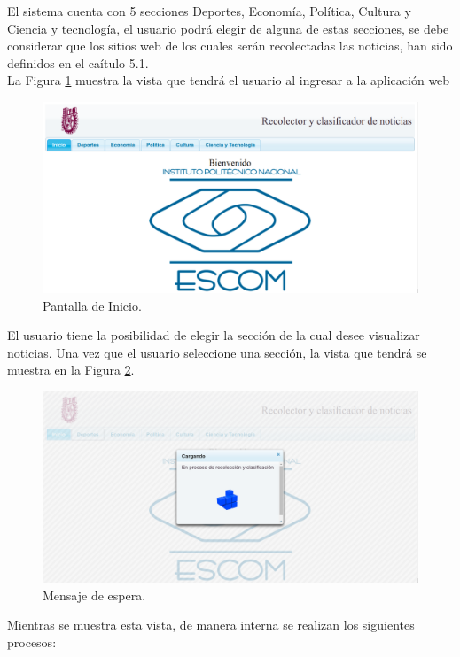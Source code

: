 El sistema cuenta con 5 secciones Deportes, Economía, Política, Cultura y Ciencia y tecnología, el usuario podrá elegir de alguna de estas secciones, se debe considerar que los sitios web de los cuales serán recolectadas las noticias, han sido definidos en el caítulo 5.1.\\
La Figura \ref{fig:PantallaInicio} muestra la vista que tendrá el usuario al ingresar a la aplicación web
\\
\begin{figure}[H]
\centering
\includegraphics[scale=0.29]{imagenes/Capitulo5/pantallaPrincipal.png}
\caption{Pantalla de Inicio.}
\label{fig:PantallaInicio}
\end{figure}

El usuario tiene la posibilidad de elegir la sección de la cual desee visualizar noticias. Una vez que el usuario seleccione una sección, la vista que tendrá se muestra en la Figura \ref{fig:loading}.
\\
\begin{figure}[H]
\centering
\includegraphics[scale=0.29]{imagenes/Capitulo5/mensajeEspera.png}
\caption{Mensaje de espera.}
\label{fig:loading}
\end{figure}

Mientras se muestra esta vista, de manera interna se realizan los siguientes procesos:


